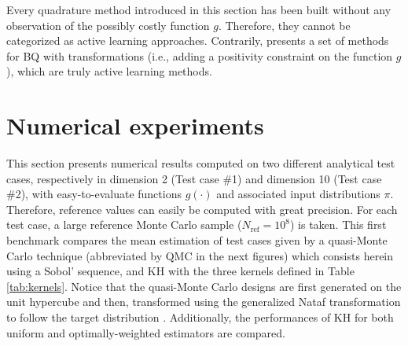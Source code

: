 \medskip
\begin{remark}
Every quadrature method introduced in this section has been built without any observation of the possibly costly function $g$. 
Therefore, they cannot be categorized as active learning approaches. 
Contrarily, \cite{motonobu_2019} presents a set of methods for BQ with transformations (i.e., adding a positivity constraint on the function $g$), which are truly active learning methods. 
\end{remark}



\section{Numerical experiments}\label{sec:sec44}
This section presents numerical results computed on two different analytical test cases, respectively in dimension 2 (Test case \#1) and dimension 10 (Test case \#2), with easy-to-evaluate functions $g(\cdot)$ and associated input distributions $\pi$. 
Therefore, reference values can easily be computed with great precision. 
For each test case, a large reference Monte Carlo sample ($N_{\mathrm{ref}} = 10^8$) is taken. 
This first benchmark compares the mean estimation of test cases given by a quasi-Monte Carlo technique (abbreviated by QMC in the next figures) which consists herein using a Sobol' sequence, and KH with the three kernels defined in Table \ref{tab:kernels}. 
Notice that the quasi-Monte Carlo designs are first generated on the unit hypercube and then, transformed using the generalized Nataf transformation to follow the target distribution \citep{lebrun_2009}. 
Additionally, the performances of KH for both uniform and optimally-weighted  estimators are compared.


